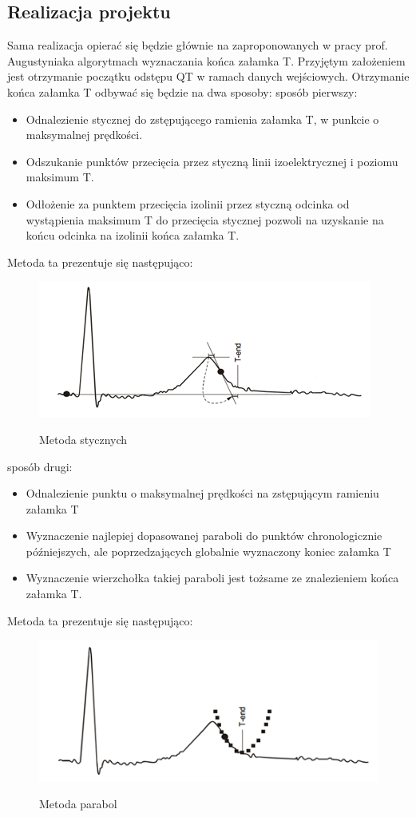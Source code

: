 \subsection{Realizacja projektu}
Sama realizacja opierać się będzie głównie na zaproponowanych w pracy prof. Augustyniaka algorytmach wyznaczania końca załamka T. Przyjętym założeniem jest otrzymanie początku odstępu QT w ramach danych wejściowych.
Otrzymanie końca załamka T odbywać się będzie na dwa sposoby:
sposób pierwszy:
\begin{itemize}
  \item Odnalezienie stycznej do zstępującego ramienia załamka T, w punkcie o maksymalnej prędkości.
  \item Odszukanie punktów przecięcia przez styczną linii izoelektrycznej i poziomu maksimum T.
  \item Odłożenie za punktem przecięcia izolinii przez styczną odcinka od wystąpienia maksimum T do przecięcia stycznej pozwoli na uzyskanie  na końcu odcinka na izolinii końca załamka T.
\end{itemize}


Metoda ta prezentuje się następująco:
\begin{figure}[H]
\centering
\includegraphics[scale=1.0]{QT_DISP/img/01}
\label{fig:Metoda 1}
\caption{Metoda stycznych}
\end{figure}

sposób drugi:
\begin{itemize}
  \item Odnalezienie punktu o maksymalnej prędkości na zstępującym ramieniu załamka T
  \item Wyznaczenie najlepiej dopasowanej paraboli do punktów chronologicznie późniejszych, ale poprzedzających globalnie wyznaczony koniec załamka T
  \item Wyznaczenie wierzchołka takiej paraboli jest tożsame ze znalezieniem końca załamka T.
\end{itemize}

Metoda ta prezentuje się następująco:
\begin{figure}[H]
\centering
\includegraphics[scale=1.0]{QT_DISP/img/02}
\label{fig:Metoda 2}
\caption{Metoda parabol}
\end{figure}
